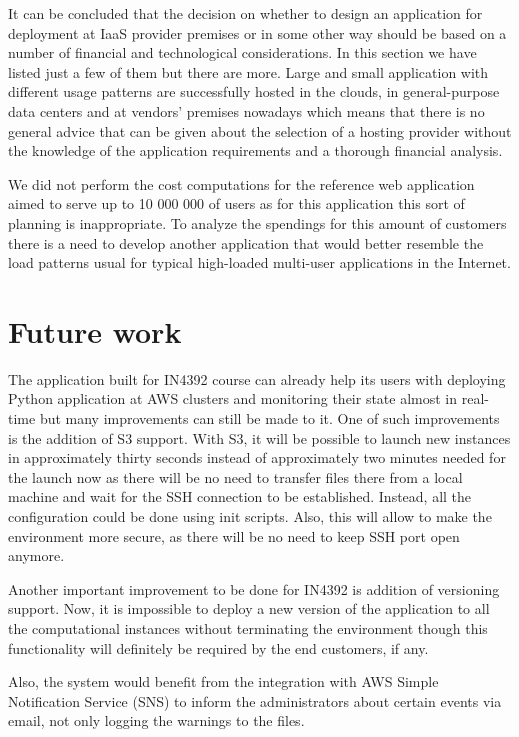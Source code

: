 \documentclass[conference]{IEEEtran}
\begin{document}
It can be concluded that the decision on whether to design an application for deployment at IaaS provider premises or in some other way should be based on a number of financial and technological considerations. In this section we have listed just a few of them but there are more. Large and small application with different usage patterns are successfully hosted in the clouds, in general-purpose data centers and at vendors' premises nowadays which means that there is no general advice that can be given about the selection of a hosting provider without the knowledge of the application requirements and a thorough financial analysis.

We did not perform the cost computations for the reference web application aimed to serve up to 10 000 000 of users as for this application this sort of planning is inappropriate. To analyze the spendings for this amount of customers there is a need to develop another application that would better resemble the load patterns usual for typical high-loaded multi-user applications in the Internet.

\section{Future work}

The application built for IN4392 course can already help its users with deploying Python application at AWS clusters and monitoring their state almost in real-time but many improvements can still be made to it. One of such improvements is the addition of S3 support. With S3, it will be possible to launch new instances in approximately thirty seconds instead of approximately two minutes needed for the launch now as there will be no need to transfer files there from a local machine and wait for the SSH connection to be established. Instead, all the configuration could be done using init scripts. Also, this will allow to make the environment more secure, as there will be no need to keep SSH port open anymore.

Another important improvement to be done for IN4392 is addition of versioning support. Now, it is impossible to deploy a new version of the application to all the computational instances without terminating the environment though this functionality will definitely be required by the end customers, if any.

Also, the system would benefit from the integration with AWS Simple Notification Service (SNS) to inform the administrators about certain events via email, not only logging the warnings to the files.
\end{document}
